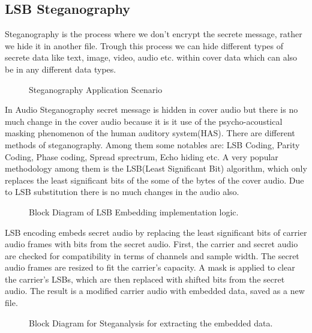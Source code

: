 \documentclass{article}
\begin{document}
\subsection{LSB Steganography}
\label{sec:steganography}
Steganography is the process where we don't encrypt the secrete message, rather we hide it in another file. Trough this process we can hide different types of secrete data like text, image, video, audio etc. within cover data which can also be in any different data types.\cite{jayaram2011information}\cite{hemeida2021comparative}
\begin{figure}[H]
    \begin{center}
        
        \caption{Steganography Application Scenario}
        \label{fig:stegoApplication}
    \end{center}
\end{figure}

In Audio Steganography secret message is hidden in cover audio but there is no much change in the cover audio because it is it use of the psycho-acoustical masking phenomenon of the human auditory system(HAS). There are different methods of steganography. Among them some notables are: LSB Coding, Parity Coding, Phase coding, Spread sprectrum, Echo hiding etc.\cite{hemeida2021comparative} A very popular methodology among them is the LSB(Least Significant Bit) algorithm, which only replaces the least significant bits of the some of the bytes of the cover audio. Due to LSB substitution there is no much changes in the audio also.
\begin{figure}[!h]
    \begin{center}
        
        \caption{Block Diagram of LSB Embedding implementation logic.}
        \label{fig:stegoEmbed}
    \end{center}
\end{figure}

LSB encoding embeds secret audio by replacing the least significant bits of carrier audio frames with bits from the secret audio. First, the carrier and secret audio are checked for compatibility in terms of channels and sample width. The secret audio frames are resized to fit the carrier’s capacity. A mask is applied to clear the carrier’s LSBs, which are then replaced with shifted bits from the secret audio. The result is a modified carrier audio with embedded data, saved as a new file.
\begin{figure}[!h]
    \begin{center}
        
        \caption{Block Diagram for Steganalysis for extracting the embedded data.}
        \label{fig:stegoExtract}
    \end{center}
\end{figure}
\end{document}
